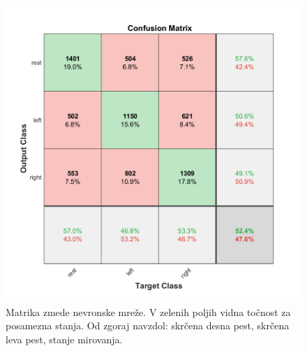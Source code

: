 \begin{figure}
\begin{center}
\includegraphics[width=0.8\linewidth]{slike/Confusion_13-20Hz_0s-4s.png}
\end{center}
\caption{Matrika zmede nevronske mreže. V zelenih poljih vidna točnost za posamezna stanja. Od zgoraj navzdol: skrčena desna pest, skrčena leva pest, stanje mirovanja.}
\label{slika:nevronska_mreza_matrika}
\end{figure}



